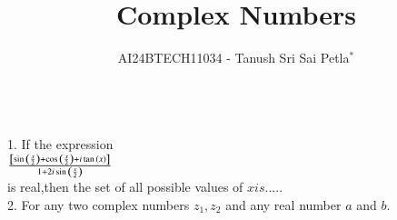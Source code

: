 \documentclass[journal,12pt,twocolumn]{IEEEtran}
\theoremstyle{remark}
\begin{document}

\vspace{3cm}

\title{Complex Numbers}
\author{AI24BTECH11034 - Tanush Sri Sai Petla$^{*}$%
}

\\
1. If the expression    \\       
$\frac{{}\left[\sin{\ensuremath{\left({\frac{x}{2}}\right)}}+\cos{\ensuremath{\left({\frac{x}{2}}\right)}}+i\tan{\ensuremath{\left(x\right)}}\right]}{1+2i\sin{\ensuremath{\left(\frac{x}{2}\right)}}}$\hfill{}\\
is real,then the set of all possible values of $x is.....$ \\
2.  For any two complex numbers $z_1,z_2$ and any real number $a$ and $b$.
\end{document}
